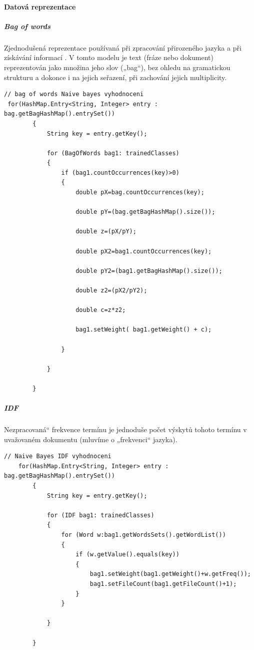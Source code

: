 \documentclass[a4paper,12pt]{article}
\begin{document}
\paragraph*{Datová reprezentace}
\subparagraph*{Bag of words}
Zjednodušená reprezentace používaná při zpracování přirozeného jazyka a při získávání informací . V tomto modelu je text (fráze nebo dokument) reprezentován jako množina jeho slov („bag“), bez ohledu na gramatickou strukturu a dokonce i na jejich seřazení, při zachování jejich multiplicity.
\begin{lstlisting}
// bag of words Naive bayes vyhodnoceni
 for(HashMap.Entry<String, Integer> entry : bag.getBagHashMap().entrySet())
        {
            String key = entry.getKey();

            for (BagOfWords bag1: trainedClasses)
            {
                if (bag1.countOccurrences(key)>0)
                {
                    double pX=bag.countOccurrences(key);

                    double pY=(bag.getBagHashMap().size());

                    double z=(pX/pY);

                    double pX2=bag1.countOccurrences(key);

                    double pY2=(bag1.getBagHashMap().size());

                    double z2=(pX2/pY2);

                    double c=z*z2;

                    bag1.setWeight( bag1.getWeight() + c);

                }

            }

        }

\end{lstlisting}
\pagebreak
\subparagraph*{IDF}
Nezpracovaná“ frekvence termínu je jednoduše počet výskytů tohoto termínu v uvažovaném dokumentu (mluvíme o „frekvenci“ jazyka).
\begin{lstlisting}
// Naive Bayes IDF vyhodnoceni
    for(HashMap.Entry<String, Integer> entry : bag.getBagHashMap().entrySet())
        {
            String key = entry.getKey();

            for (IDF bag1: trainedClasses)
            {
                for (Word w:bag1.getWordsSets().getWordList())
                {
                    if (w.getValue().equals(key))
                    {
                        bag1.setWeight(bag1.getWeight()+w.getFreq());
                        bag1.setFileCount(bag1.getFileCount()+1);
                    }
                }

            }

        }
\end{lstlisting}
\end{document}
